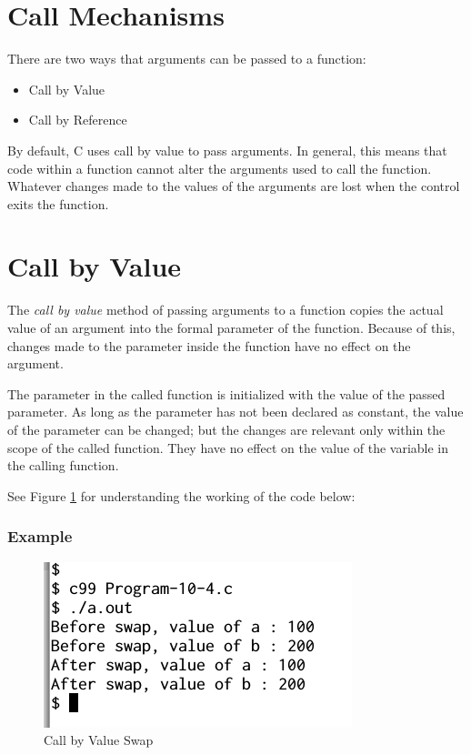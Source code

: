 \documentclass[11pt,a4paper]{article}
\begin{document}
\section*{Call Mechanisms}
There are two ways that arguments can be passed to a function:
\begin{itemize}
\item Call by Value
\item Call by Reference
\end{itemize}

By default, C uses call by value to pass arguments. In general, this means that code within a function cannot alter the arguments used to call the function. Whatever changes made to the values of the arguments are lost when the control exits the function.

\section*{Call by Value}
The \emph{call by value} method of passing arguments to a function copies the actual value of an argument into the formal parameter of the function. Because of this, changes made to the parameter inside the function have no effect on the argument.

The parameter in the called function is initialized with the value of the passed parameter. As long as the parameter has not been declared as constant, the value of the parameter can be changed; but the changes are relevant only within the scope of the called function. They have no effect on the value of the variable in the calling function.

See Figure \ref{output-10-4} for understanding the working of the code below:
 
\subsubsection*{Example}
 


\begin{figure}[ht]
\begin{center}
\includegraphics[scale=0.6]{Output-10-4.png}
\caption{Call by Value Swap}
\label{output-10-4}
\end{center}
\end{figure}
\end{document}
